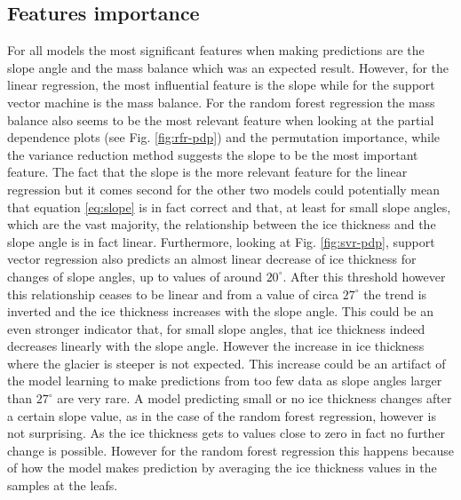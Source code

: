 \subsection{Features importance}\label{disc-features}
For all models the most significant features when making predictions are the slope angle and the mass balance which was an expected result. However, for the linear regression, the most influential feature is the slope while for the support  vector machine is the mass balance. For the random forest regression the mass balance also seems to be the most relevant feature when looking at the partial dependence plots (see Fig. \ref{fig:rfr-pdp}) and the permutation importance, while the variance reduction method suggests the slope to be the most important feature. The fact that the slope is the more relevant feature for the linear regression but it comes second for the other two models could potentially mean that equation \ref{eq:slope} is in fact correct and that, at least for small slope angles, which are the vast majority, the relationship between the ice thickness and the slope angle is in fact linear. Furthermore, looking at Fig. \ref{fig:svr-pdp}, support vector regression also predicts an almost linear decrease of ice thickness for changes of slope angles, up to values of around $20^{\circ}$. After this threshold however this relationship ceases to be linear and from a value of circa $27^{\circ}$ the trend is inverted and the ice thickness increases with the slope angle. This could be an even stronger indicator that, for small slope angles, that ice thickness indeed decreases linearly with the slope angle. However the increase in ice thickness where the glacier is steeper is not expected. This increase could be an artifact of the model learning to make predictions from too few data as slope angles larger than $27^{\circ}$ are very rare. A model predicting small or no ice thickness changes after a certain slope value, as in the case of the random forest regression, however is not surprising. As the ice thickness gets to values close to zero in fact no further change is possible. However for the random forest regression this happens because of how the model makes prediction by averaging the ice thickness values in the samples at the leafs.

